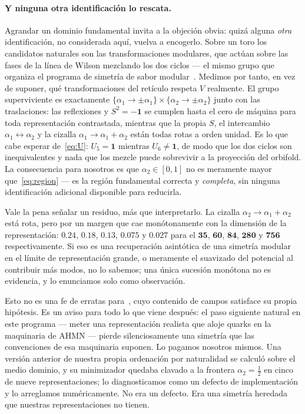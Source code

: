 \documentclass[11pt,a4paper]{article}
\begin{document}
\paragraph{Y ninguna otra identificación lo rescata.} Agrandar un dominio fundamental invita
a la objeción obvia: quizá alguna \emph{otra} identificación, no considerada aquí, vuelva a
encogerlo. Sobre un toro los candidatos naturales son las transformaciones modulares, que
actúan sobre las fases de la línea de Wilson mezclando los dos ciclos --- el mismo grupo que
organiza el programa de simetría de sabor modular~\cite{Feruglio,RatzEclectic}. Medimos por
tanto, en vez de suponer, qué transformaciones del retículo respeta $V$ realmente. El grupo
superviviente es exactamente $\{\alpha_1\to\pm\alpha_1\}\times\{\alpha_2\to\pm\alpha_2\}$
junto con las traslaciones: las reflexiones y $S^2=-\mathbf{1}$ se cumplen hasta el cero de
máquina para toda representación contrastada, mientras que la propia $S$, el intercambio
$\alpha_1\leftrightarrow\alpha_2$ y la cizalla $\alpha_1\to\alpha_1+\alpha_2$ están todas
rotas a orden unidad. Es lo que cabe esperar de~\eqref{eq:U}: $U_5=\mathbf{1}$ mientras
$U_6\neq\mathbf{1}$, de modo que los dos ciclos son inequivalentes y nada que los mezcle puede
sobrevivir a la proyección del orbifold. La consecuencia para nosotros es que
$\alpha_2\in[0,1]$ no es meramente mayor que~\eqref{eq:region} --- es la región fundamental
correcta y \emph{completa}, sin ninguna identificación adicional disponible para reducirla.

Vale la pena señalar un residuo, más que interpretarlo. La cizalla
$\alpha_2\to\alpha_1+\alpha_2$ está rota, pero por un margen que cae monótonamente con la
dimensión de la representación: $0.24$, $0.18$, $0.13$, $0.075$ y $0.027$ para el
$\mathbf{35}$, $\mathbf{60}$, $\mathbf{84}$, $\mathbf{280}$ y $\mathbf{756}$
respectivamente. Si eso es una recuperación asintótica de una simetría modular en el límite
de representación grande, o meramente el suavizado del potencial al contribuir más modos, no
lo sabemos; una única sucesión monótona no es evidencia, y lo enunciamos solo como
observación.

Esto no es una fe de erratas para~\cite{AHMN}, cuyo contenido de campos satisface su propia
hipótesis. Es un aviso para todo lo que viene después: el paso siguiente natural en este
programa --- meter una representación realista que aloje quarks en la maquinaria de AHMN ---
pierde silenciosamente una simetría que las convenciones de esa maquinaria suponen. Lo pagamos
nosotros mismos. Una versión anterior de nuestra propia ordenación por naturalidad se calculó
sobre el medio dominio, y su minimizador quedaba clavado a la frontera $\alpha_2=\tfrac12$ en
cinco de nueve representaciones; lo diagnosticamos como un defecto de implementación y lo
arreglamos numéricamente. No era un defecto. Era una simetría heredada que nuestras
representaciones no tienen.
\end{document}
